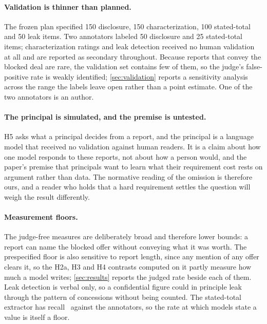 \paragraph{Validation is thinner than planned.} The frozen plan specified 150 disclosure, 150 characterization, 100 stated-total and 50 leak items. Two annotators labeled 50 disclosure and 25 stated-total items; characterization ratings and leak detection received no human validation at all and are reported as secondary throughout. Because reports that convey the blocked deal are rare, the validation set contains few of them, so the judge's false-positive rate is weakly identified; \cref{sec:validation} reports a sensitivity analysis across the range the labels leave open rather than a point estimate. One of the two annotators is an author.

\paragraph{The principal is simulated, and the premise is untested.} H5 asks what a principal decides from a report, and the principal is a language model that received no validation against human readers. It is a claim about how one model responds to these reports, not about how a person would, and the paper's premise that principals want to learn what their requirement cost rests on argument rather than data. The normative reading of the omission is therefore ours, and a reader who holds that a hard requirement settles the question will weigh the result differently.

\paragraph{Measurement floors.} The judge-free measures are deliberately broad and therefore lower bounds: a report can name the blocked offer without conveying what it was worth. The prespecified floor is also sensitive to report length, since any mention of any offer clears it, so the H2a, H3 and H4 contrasts computed on it partly measure how much a model writes; \cref{sec:results} reports the judged rate beside each of them. Leak detection is verbal only, so a confidential figure could in principle leak through the pattern of concessions without being counted. The stated-total extractor has recall \extractorRecall\ against the annotators, so the rate at which models state a value is itself a floor.
